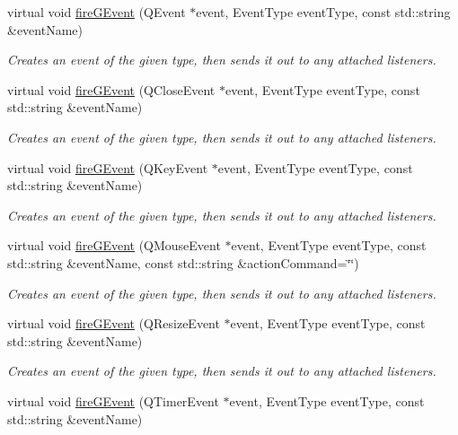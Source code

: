 \begin{DoxyCompactItemize}
virtual void \mbox{\hyperlink{classGObservable_ab3983ea07337b52020a29cc00c653d8d}{fire\+G\+Event}} (Q\+Event $\ast$event, Event\+Type event\+Type, const std\+::string \&event\+Name)
\begin{DoxyCompactList}\small\item\em Creates an event of the given type, then sends it out to any attached listeners. \end{DoxyCompactList}\item 
virtual void \mbox{\hyperlink{classGObservable_a01fdf1b0e0dbd49e189fe4514e010411}{fire\+G\+Event}} (Q\+Close\+Event $\ast$event, Event\+Type event\+Type, const std\+::string \&event\+Name)
\begin{DoxyCompactList}\small\item\em Creates an event of the given type, then sends it out to any attached listeners. \end{DoxyCompactList}\item 
virtual void \mbox{\hyperlink{classGObservable_abb0b2f66ba39211cb5d7615e9d1c04e2}{fire\+G\+Event}} (Q\+Key\+Event $\ast$event, Event\+Type event\+Type, const std\+::string \&event\+Name)
\begin{DoxyCompactList}\small\item\em Creates an event of the given type, then sends it out to any attached listeners. \end{DoxyCompactList}\item 
virtual void \mbox{\hyperlink{classGObservable_a119318675d2165bdf7dd853aaf881d4b}{fire\+G\+Event}} (Q\+Mouse\+Event $\ast$event, Event\+Type event\+Type, const std\+::string \&event\+Name, const std\+::string \&action\+Command=\char`\"{}\char`\"{})
\begin{DoxyCompactList}\small\item\em Creates an event of the given type, then sends it out to any attached listeners. \end{DoxyCompactList}\item 
virtual void \mbox{\hyperlink{classGObservable_a63fd9034e1e1633c1c38eb342bfd34e9}{fire\+G\+Event}} (Q\+Resize\+Event $\ast$event, Event\+Type event\+Type, const std\+::string \&event\+Name)
\begin{DoxyCompactList}\small\item\em Creates an event of the given type, then sends it out to any attached listeners. \end{DoxyCompactList}\item 
virtual void \mbox{\hyperlink{classGObservable_a741345310d9b7c5170a6cbc410c44ac4}{fire\+G\+Event}} (Q\+Timer\+Event $\ast$event, Event\+Type event\+Type, const std\+::string \&event\+Name)

\end{DoxyCompactItemize}
